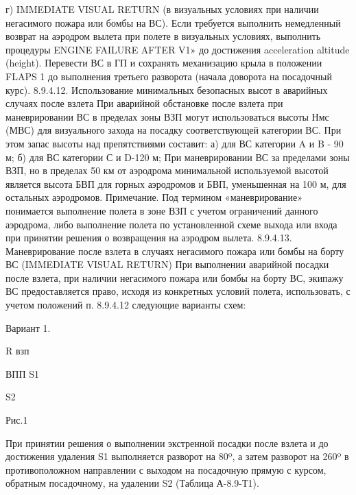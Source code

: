 г) IMMEDIATE VISUAL RETURN (в визуальных условиях при наличии негасимого пожара или бомбы на ВС). 
Если требуется выполнить немедленный возврат на аэродром вылета при полете в визуальных условиях, выполнить процедуры ENGINE FAILURE AFTER V1» до достижения acceleration altitude (height). Перевести ВС в ГП и сохранять механизацию крыла в положении FLAPS 1 до выполнения третьего разворота (начала доворота на посадочный курс).
8.9.4.12.	Использование минимальных безопасных высот в аварийных случаях после взлета
При аварийной обстановке после взлета при маневрировании ВС в пределах зоны ВЗП могут использоваться высоты Нмс (МВС) для визуального захода на посадку соответствующей категории ВС. При этом запас высоты над препятствиями составит:
а)	для ВС категории A и B - 90 м;
б)	для ВС категории С и D-120 м;
При маневрировании ВС за пределами зоны ВЗП, но в пределах 50 км от аэродрома минимальной используемой высотой является высота БВП для горных аэродромов и БВП, уменьшенная на 100 м, для остальных аэродромов. 
Примечание. Под термином «маневрирование» понимается выполнение полета в зоне ВЗП с учетом ограничений данного аэродрома, либо выполнение полета по установленной схеме выхода или входа при принятии решения о возвращения на аэродром вылета.
8.9.4.13.	Маневрирование после взлета в случаях негасимого пожара или бомбы на борту ВС (IMMEDIATE VISUAL RETURN)
При выполнении аварийной посадки после взлета, при наличии негасимого пожара или бомбы на борту ВС, экипажу ВС предоставляется право, исходя из конкретных условий полета, использовать, с учетом положений п. 8.9.4.12 следующие варианты схем:




Вариант 1.

                                                 R взп
	
                                                                                   
                                                                  ВПП          S1
                                       

                                                                                              S2
                                                                  



Рис.1


При принятии решения о выполнении экстренной посадки после взлета и до достижения удаления S1 выполняется разворот на 80º, а затем разворот на 260º в противоположном направлении с выходом на посадочную прямую с курсом, обратным посадочному, на удалении S2 (Таблица А-8.9-Т1).








